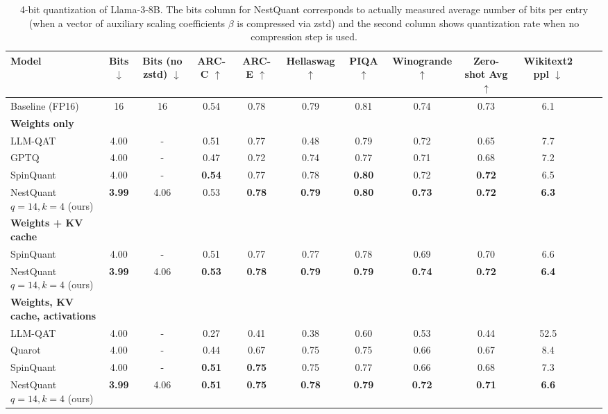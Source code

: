 \ifisicml
\begin{table*}[t]
\centering
\begin{adjustbox}{max width=2\columnwidth} %
\begin{tabular}{lccccccccccc}
    \toprule
\textbf{Model} & \textbf{Bits} $\downarrow$ & \textbf{Bits (no zstd)} $\downarrow$ & \textbf{ARC-C} $\uparrow$ & \textbf{ARC-E} $\uparrow$ & \textbf{Hellaswag} $\uparrow$ &  \textbf{PIQA} $\uparrow$ & \textbf{Winogrande} $\uparrow$ & \textbf{Zero-shot Avg} $\uparrow$ & \textbf{Wikitext2 ppl} $\downarrow$ \\ 
\midrule
    Baseline (FP16) & 16 & 16 & 0.54 & 0.78 & 0.79 & 0.81 & 0.74 & 0.73& 6.1\\
    \midrule
    \textbf{Weights only} \\
    LLM-QAT & 4.00 & - & 0.51 & 0.77 & 0.48 & 0.79 & 0.72 & 0.65 & 7.7\\
    GPTQ & 4.00 & - & 0.47 & 0.72 & 0.74 & 0.77 & 0.71 & 0.68 & 7.2\\
    SpinQuant          & 4.00& -&\textbf{0.54}& 0.77& 0.78 & \textbf{0.80}& 0.72& \textbf{0.72}& 6.5\\
    NestQuant $q=14,k=4$ (ours)           & \textbf{3.99}& 4.06 & 0.53 & \textbf{0.78} & \textbf{0.79} & \textbf{0.80} & \textbf{0.73} & \textbf{0.72}& \textbf{6.3}\\
    \midrule
    \textbf{Weights + KV cache} \\
    SpinQuant & 4.00& - & 0.51& 0.77& 0.77& 0.78& 0.69& 0.70& 6.6 \\
    NestQuant $q=14,k=4$ (ours)           & \textbf{3.99}& 4.06 & \textbf{0.53} & \textbf{0.78} & \textbf{0.79} &  \textbf{0.79} &\textbf{ 0.74} & \textbf{0.72}& \textbf{6.4}\\
    \midrule
    \textbf{Weights, KV cache, activations} \\
    LLM-QAT & 4.00 & - & 0.27 & 0.41 & 0.38 & 0.60 & 0.53 & 0.44 & 52.5 \\
    Quarot & 4.00& - & 0.44 & 0.67 & 0.75 & 0.75 & 0.66 & 0.67 & 8.4 \\
    SpinQuant & 4.00& - & \textbf{0.51}& \textbf{0.75}& 0.75&0.77& 0.66& 0.68& 7.3 \\
    NestQuant $q=14,k=4$ (ours)     & \textbf{3.99}& 4.06 & \textbf{0.51} & \textbf{0.75} & \textbf{0.78} & \textbf{0.79} & \textbf{0.72} & \textbf{0.71}& \textbf{6.6}\\
    \bottomrule
\end{tabular}
\end{adjustbox}
\caption{4-bit quantization of Llama-3-8B. The bits column for NestQuant corresponds to actually measured average number of bits per entry (when a vector of auxiliary scaling coefficients $\beta$ is compressed via zstd) and the second column shows quantization rate when no compression step is used.} 
\label{tab:llama3_8b}
\end{table*}
\fi

